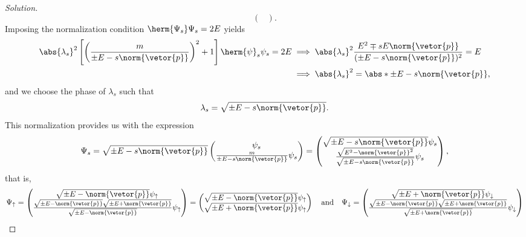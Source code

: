 \begin{proof}[Solution]
\begin{equation*}
\begin{pmatrix}
      \end{pmatrix}.
   \end{equation*}
   Imposing the normalization condition \(\herm{\Psi_s}\Psi_s = 2 E\) yields
   \begin{align*}
      \abs{\lambda_s}^2 \left[\left(\frac{m}{\pm E - s \norm{\vetor{p}}}\right)^2 + 1\right]\herm{\psi}_s\psi_s = 2E
      &\implies \abs{\lambda_s}^2 \frac{E^2 \mp s E\norm{\vetor{p}}}{(\pm E - s \norm{\vetor{p}})^2} = E\\
      &\implies \abs{\lambda_s}^2 = \abs*{\pm E - s \norm{\vetor{p}}},
   \end{align*}
   and we choose the phase of \(\lambda_s\) such that
   \begin{equation*}
      \lambda_s = \sqrt{\pm E - s \norm{\vetor{p}}}.
   \end{equation*}
   This normalization provides us with the expression
   \begin{equation*}
      \Psi_s = \sqrt{\pm E - s \norm{\vetor{p}}} \begin{pmatrix}
         \psi_s\\
         \frac{m}{\pm E -s \norm{\vetor{p}}} \psi_s
      \end{pmatrix} = 
      \begin{pmatrix}
         \sqrt{\pm E - s \norm{\vetor{p}}}\psi_s\\
         \frac{\sqrt{E^2 - \norm{\vetor{p}}^2}}{\sqrt{\pm E -s \norm{\vetor{p}}}} \psi_s
      \end{pmatrix},
   \end{equation*}
   that is,
   \begin{equation*}
      \Psi_\uparrow =  \begin{pmatrix}
         \sqrt{\pm E - \norm{\vetor{p}}} \psi_\uparrow\\
         \frac{\sqrt{\pm E - \norm{\vetor{p}}} \sqrt{\pm E + \norm{\vetor{p}}}}{\sqrt{\pm E - \norm{\vetor{p}}}} \psi_\uparrow
      \end{pmatrix}
      =
      \begin{pmatrix}
         \sqrt{\pm E - \norm{\vetor{p}}} \psi_{\uparrow}\\
         \sqrt{\pm E + \norm{\vetor{p}}} \psi_{\uparrow}
      \end{pmatrix}
      \quad\text{and}\quad
      \Psi_\downarrow =  \begin{pmatrix}
         \sqrt{\pm E + \norm{\vetor{p}}} \psi_\downarrow\\
         \frac{\sqrt{\pm E - \norm{\vetor{p}}} \sqrt{\pm E + \norm{\vetor{p}}}}{\sqrt{\pm E + \norm{\vetor{p}}}} \psi_\downarrow

\end{pmatrix}
\end{equation*}
\end{proof}
